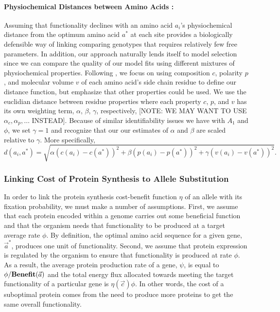 \documentclass{article}
\newcommand{\cvec}{\ensuremath{\Vec{c}}\xspace}
\newcommand{\avec}{\ensuremath{\Vec{a}}\xspace}
\newcommand{\aopt}{\ensuremath{a^*}\xspace}
\newcommand{\aoptvec}{\ensuremath{\Vec{a}^*}\xspace}
\newcommand{\Func}{\ensuremath{\text{\textbf{Benefit}}}\xspace}
\begin{document}
\paragraph*{Physiochemical Distances between Amino Acids :}
Assuming that functionality declines with an amino acid $a_i$'s physiochemical distance from the optimum amino acid \aopt at each site  provides a biologically defensible way of linking comparing genotypes that requires relatively few free parameters.
In addition, our approach naturally lends itself to model selection since we can compare the quality of our model fits using different mixtures of physiochemical properties.
Following \citet{Grantham74}, we focus on using composition $c$, polarity $p$, and molecular volume $v$ of each amino acid's side chain residue to define our distance function, but emphasize that other properties could be used.
We use the euclidian distance between residue properties where each property $c$, $p$, and $v$ has its own weighting term, $\alpha$, $\beta$, $\gamma$, respectively, [NOTE: WE MAY WANT TO USE $\alpha_c, \alpha_p, \ldots $ INSTEAD].
Because of similar identifiability issues we have with $A_1$ and $\phi$, we set $\gamma = 1$ and recognize that our our estimates of $\alpha$ and $\beta$ are scaled relative to $\gamma$.
More specifically,
\begin{equation*}
  d(a_i, \aopt) = \sqrt{\alpha \left(c\left(a_i\right) - c\left(\aopt\right)\right)^2 + \beta \left(p\left(a_i\right) - p\left(\aopt\right)\right)^2 +  \gamma \left(v\left(a_i\right) - v\left(\aopt\right)\right)^2}.
\end{equation*}



\subsubsection*{Linking Cost of Protein Synthesis to Allele Substitution}
In order to link the protein synthesis cost-benefit function $\eta$ of an allele with its fixation probability, we must make a number of assumptions.
First, we assume that each protein encoded within a genome carries out some beneficial function and that the organism needs that functionality to be produced at a target average rate $\phi$.
By definition, the optimal amino acid sequence for a given gene, \aoptvec, produces one unit of functionality.
Second, we assume that protein expression is regulated by the organism to ensure that functionality is produced at rate $\phi$.
As a result, the average protein production rate of a gene, $\psi$, is equal to $\phi/\Func(\avec)$ and the total energy flux allocated towards meeting the target functionality of a particular gene is $\eta(\cvec) \phi$. 
In other words, the cost of a suboptimal protein comes from the need to produce more proteins to get the same overall functionality.
\end{document}
